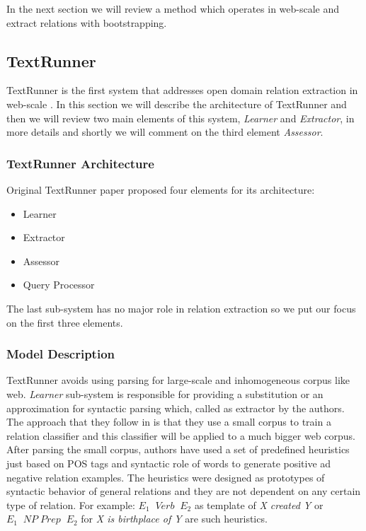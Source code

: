 In the next section we will review a method which operates in web-scale and extract relations with bootstrapping.




\subsection{TextRunner}
\label{ssec:textrunner}

TextRunner is the first system that addresses open domain relation extraction in web-scale \cite{Yates2007}. In this section
 we will describe the architecture of TextRunner and then we will review two main elements of this system, \emph{Learner} and
  \emph{Extractor}, in more details and shortly we will comment on the third element \emph{Assessor}.
 
\subsubsection{TextRunner Architecture}
\label{ssec:textrunner-arch}

Original TextRunner paper proposed four elements for its architecture:
\begin{itemize}
  \item Learner
  \item Extractor
  \item Assessor
  \item Query Processor
\end{itemize}

The last sub-system has no major role in relation extraction so we put our focus on the first three elements.

\subsubsection{Model Description}
\label{ssec:model-dscrb}

TextRunner avoids using parsing for large-scale and inhomogeneous corpus like web. \emph{Learner} sub-system is responsible
 for providing a substitution or an approximation for syntactic parsing which, called as extractor by the authors.
  The approach that they follow in \cite{Yates2007}
  is that they use a small corpus to train a  relation classifier and this
  classifier will be applied to a much bigger web corpus.
   After parsing the small corpus, authors have used a set of predefined heuristics just based on POS tags and syntactic role 
   of words to generate positive ad negative relation examples. The heuristics were designed as prototypes of syntactic behavior
   of general relations and they are not dependent on any certain type of relation. 
   For example:   $E_1 \;\; Verb \;\; E_2$ as template of \emph{X created Y} or 
   $ E_1 \; \; NP \;  Prep \; \; E_2$ for \emph{X is birthplace of Y} are such heuristics.\\
   
